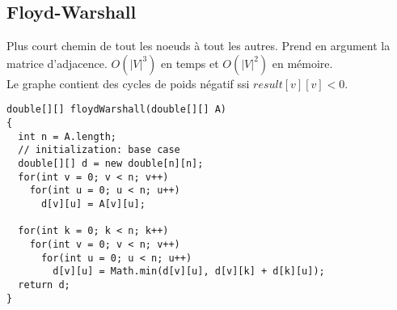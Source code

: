 \subsection{Floyd-Warshall}
Plus court chemin de tout les noeuds à tout les autres. Prend en argument la matrice d'adjacence. $O(|V|^3)$ en temps et $O(|V|^2)$ en mémoire.\\
Le graphe contient des cycles de poids négatif ssi $result[v][v]<0$.\\

\begin{lstlisting}
double[][] floydWarshall(double[][] A)
{
  int n = A.length;
  // initialization: base case
  double[][] d = new double[n][n];
  for(int v = 0; v < n; v++)
    for(int u = 0; u < n; u++)
      d[v][u] = A[v][u];

  for(int k = 0; k < n; k++)
    for(int v = 0; v < n; v++)
      for(int u = 0; u < n; u++)
        d[v][u] = Math.min(d[v][u], d[v][k] + d[k][u]);
  return d;
}
\end{lstlisting}